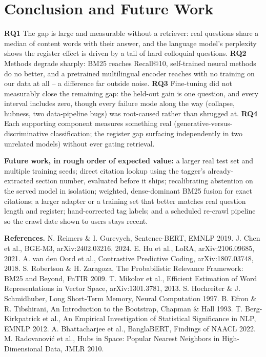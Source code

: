 \documentclass[10pt,a4paper]{article}
\begin{document}
\section{Conclusion and Future Work}

\textbf{RQ1} The gap is large and measurable without a retriever: real questions share a median of \overlapMedianReal{} content words with their answer, and the language model's perplexity shows the register effect is driven by a tail of hard colloquial questions. \textbf{RQ2} Methods degrade sharply: BM25 reaches \RtenBmLadder{} Recall@10, self-trained neural methods do no better, and a pretrained multilingual encoder reaches \RtenZsLadder{} with no training on our data at all -- a difference far outside noise. \textbf{RQ3} Fine-tuning did not measurably close the remaining gap: the held-out gain is one question, and every interval includes zero, though every failure mode along the way (collapse, hubness, two data-pipeline bugs) was root-caused rather than shrugged at. \textbf{RQ4} Each supporting component measures something real (generative-versus-discriminative classification; the register gap surfacing independently in two unrelated models) without ever gating retrieval.

\textbf{Future work, in rough order of expected value:} a larger real test set and multiple training seeds; direct citation lookup using the tagger's already-extracted section number, evaluated before it ships; recalibrating abstention on the served model in isolation; weighted, dense-dominant BM25 fusion for exact citations; a larger adapter or a training set that better matches real question length and register; hand-corrected tag labels; and a scheduled re-crawl pipeline so the crawl date shown to users stays recent.

\bigskip
{\small
\textbf{References.} N. Reimers \& I. Gurevych, Sentence-BERT, EMNLP 2019. J. Chen et al., BGE-M3, arXiv:2402.03216, 2024. E. Hu et al., LoRA, arXiv:2106.09685, 2021. A. van den Oord et al., Contrastive Predictive Coding, arXiv:1807.03748, 2018. S. Robertson \& H. Zaragoza, The Probabilistic Relevance Framework: BM25 and Beyond, FnTIR 2009. T. Mikolov et al., Efficient Estimation of Word Representations in Vector Space, arXiv:1301.3781, 2013. S. Hochreiter \& J. Schmidhuber, Long Short-Term Memory, Neural Computation 1997. B. Efron \& R. Tibshirani, An Introduction to the Bootstrap, Chapman \& Hall 1993. T. Berg-Kirkpatrick et al., An Empirical Investigation of Statistical Significance in NLP, EMNLP 2012. A. Bhattacharjee et al., BanglaBERT, Findings of NAACL 2022. M. Radovanovi\'c et al., Hubs in Space: Popular Nearest Neighbors in High-Dimensional Data, JMLR 2010.}
\end{document}

